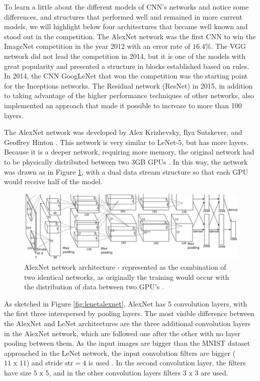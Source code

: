 To learn a little about the different models of CNN's networks and notice some differences, and structures that performed well and remained in more current models, we will highlight below four architectures that became well known and stood out in the competition. The AlexNet network was the first CNN to win the ImageNet competition in the year 2012 with an error rate of $16.4\%$. The VGG network did not lead the competition in 2014, but it is one of the models with great popularity and presented a structure in blocks established based on rules. In 2014, the CNN GoogLeNet that won the competition was the starting point for the Inceptions networks. The Residual network (ResNet) in 2015, in addition to taking advantage of the higher performance techniques of other networks, also implemented an approach that made it possible to increase to more than 100 layers.

The AlexNet network was developed by Alex Krizhevsky, Ilya Sutskever, and Geoffrey Hinton \cite{geron2019}. This network is very similar to LeNet-5, but has more layers. Because it is a deeper network, requiring more memory, the original network had to be physically distributed between two 3GB GPUs  \cite{krizhevsky2012}. In this way, the network was drawn as in Figure \ref{fig:alexnet}, with a dual data stream structure so that each GPU would receive half of the model.

\begin{figure}
    \centering
    \includegraphics[scale=0.4]{images/figure128.png}
    \caption{ AlexNet network architecture - represented as the combination of two identical networks, as originally the training would occur with the distribution of data between two GPU's \cite{krizhevsky2012}.}
    \label{fig:alexnet}
\end{figure}

As sketched in Figure \ref{fig:lenetalexnet}, AlexNet has 5 convolution layers, with the first three interspersed by pooling layers. The most visible difference between the AlexNet and LeNet architectures are the three additional convolution layers in the AlexNet network, which are followed one after the other with no layer pooling between them. As the input images are bigger than the MNIST dataset approached in the LeNet network, the input convolution filters are bigger ($11\text{ x }11$) and stride $\text{str} = 4$ is used . In the second convolution layer, the filters have size $5\text{ x }5$, and in the other convolution layers filters $3\text{ x }3$ are used.

